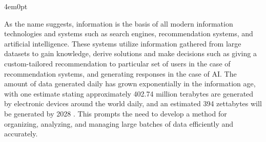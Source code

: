 \begin{indentedblock}{4em}{0pt}
			
			As the name suggests, information is the basis of all modern information technologies and systems such as search engines, recommendation systems, and artificial intelligence. These systems utilize information gathered from large datasets to gain knowledge, derive solutions and make decisions such as giving a custom-tailored recommendation to particular set of users in the case of recommendation systems, and generating responses in the case of AI. The amount of data generated daily has grown exponentially in the information age, with one estimate stating approximately 402.74 million terabytes are generated by electronic devices around the world daily, and an estimated 394 zettabytes will be generated by 2028 \parencite{data_growth_worldwide_taylor}. This prompts the need to develop a method for organizing, analyzing, and managing large batches of data efficiently and accurately. 
		\end{indentedblock}

